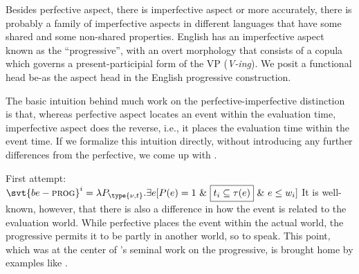 %
%
Besides perfective aspect, there is imperfective aspect \dash or more
accurately, there is probably a family of imperfective aspects in different
languages that have some shared and some non-shared properties. English has an
imperfective aspect known as the ``progressive'', with an overt morphology that
consists of a copula which governs a present-participial form of the VP
(\emph{V-ing}). We posit a functional head be-\prog as the aspect head in the
English progressive construction.

The basic intuition behind much work on the perfective-imperfective distinction
is that, whereas perfective aspect locates an event within the evaluation time,
imperfective aspect does the reverse, i.e., it places the evaluation time within
the event time. If we formalize this intuition directly, without introducing any
further differences from the perfective, we come up with \Next.

\clearpage
\ex{}%
First attempt:\label{ex:prog-simple}\\
$\svt{be-\prog}^{i} = \lambda P_{\type{\nu,t}}. \exists e [P(e) = 1\ \& \
\boxed{t_{i} \subseteq \tau(e)}\ \&\ e \le w_{i}]$
\xe
%
It is well-known, however, that there is also a difference in how the event is
related to the evaluation world. While perfective places the event within the
actual world, the progressive permits it to be partly in another world, so to
speak. This point, which was at the center of \cite{dowty-1977-progressive}'s
seminal work on the progressive, is brought home by examples like \Next.

